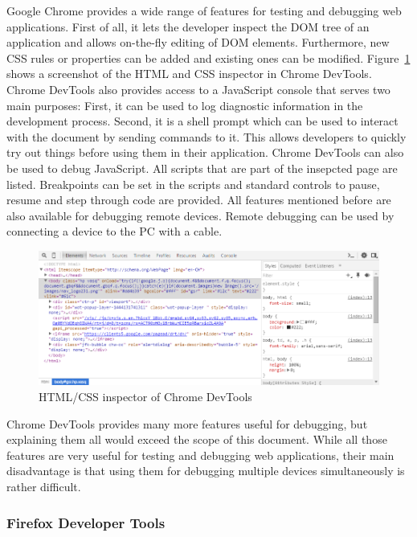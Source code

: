 Google Chrome provides a wide range of features for testing and debugging web applications. First of all, it lets the developer inspect the DOM tree of an application and allows on-the-fly editing of DOM elements. Furthermore, new CSS rules or properties can be added and existing ones can be modified. Figure~\ref{fig:chrome_devtools} shows a screenshot of the HTML and CSS inspector in Chrome DevTools. Chrome DevTools also provides access to a JavaScript console that serves two main purposes: First, it can be used to log diagnostic information in the development process. Second, it is a shell prompt which can be used to interact with the document by sending commands to it. This allows developers to quickly try out things before using them in their application. Chrome DevTools can also be used to debug JavaScript. All scripts that are part of the insepcted page are listed. Breakpoints can be set in the scripts and standard controls to pause, resume and step through code are provided. All features mentioned before are also available for debugging remote devices. Remote debugging can be used by connecting a device to the PC with a cable.

\begin{figure}[H]
  \centering
    \includegraphics[width=1.0\textwidth]{images/relatedwork/chrome_devtools_3.png}
	\caption[Screenshot: Chrome DevTools]{HTML/CSS inspector of Chrome DevTools}
	\label{fig:chrome_devtools}
\end{figure}

Chrome DevTools provides many more features useful for debugging, but explaining them all would exceed the scope of this document. While all those features are very useful for testing and debugging web applications, their main disadvantage is that using them for debugging multiple devices simultaneously is rather difficult.

\subsubsection{Firefox Developer Tools}

